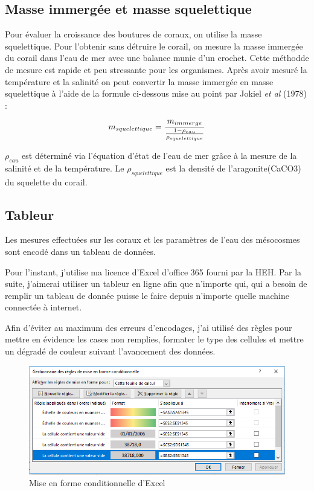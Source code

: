 \documentclass[]{report}
\begin{document}
\subsection{Masse immergée et masse
squelettique}\label{masse-immergee-et-masse-squelettique}

Pour évaluer la croissance des boutures de coraux, on utilise la masse
squelettique. Pour l'obtenir sans détruire le corail, on mesure la masse
immergée du corail dans l'eau de mer avec une balance munie d'un
crochet. Cette méthodde de mesure est rapide et peu stressante pour les
organismes. Après avoir mesuré la température et la salinité on peut
convertir la masse immergée en masse squelettique à l'aide de la formule
ci-dessous mise au point par Jokiel \emph{et al} (1978) :

\begin{equation}
\large
  m_{squelettique} = \frac {m_{immerge}}{ \frac{1 - \rho_{eau}}{ \rho_{squelettique}}}
\end{equation}

\(\rho_{eau}\) est déterminé via l'équation d'état de l'eau de mer grâce
à la mesure de la salinité et de la température. Le
\(\rho_{squelettique}\) est la densité de l'aragonite(CaCO3) du
squelette du corail.

\subsection{Tableur}\label{tableur}

Les mesures effectuées sur les coraux et les paramètres de l'eau des
mésocosmes sont encodé dans un tableau de données.

Pour l'instant, j'utilise ma licence d'Excel d'office 365 fourni par la
HEH. Par la suite, j'aimerai utiliser un tableur en ligne afin que
n'importe qui, qui a besoin de remplir un tableau de donnée puisse le
faire depuis n'importe quelle machine connectée à internet.

Afin d'éviter au maximum des erreurs d'encodages, j'ai utilisé des
règles pour mettre en évidence les cases non remplies, formater le type
des cellules et mettre un dégradé de couleur suivant l'avancement des
données.

\begin{figure}[h!]
\includegraphics[]{../image/excel3.PNG}
\caption{Mise en forme conditionnelle d'Excel}
\end{figure}
\end{document}
